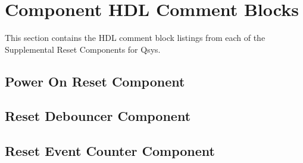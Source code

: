 \documentclass{article}
\begin{document}
\begin{flushleft}
\end{flushleft}

\section*{Component HDL Comment Blocks}
\begin{flushleft}
\noindent
This section contains the HDL comment block listings from each of the Supplemental Reset Components for Qsys.
\end{flushleft}

\subsection*{Power On Reset Component}


\subsection*{Reset Debouncer Component}


\subsection*{Reset Event Counter Component}

\end{document}
